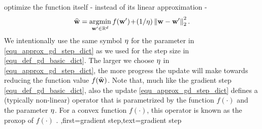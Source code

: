 {{		optimize the function itself - instead of its linear approximation - 
		\begin{align} 
		\label{equ_approx_gd_step_dict}
		\widehat{{\bf w}} = \operatorname*{argmin}_{{\bf w}' \in \mathbb{R}^{d}} f({\bf w}')\!+\!(1/\eta)\left\Vert {{\bf w}-{\bf w}'} \right\Vert_{2}^2. 
		\end{align}
		We intentionally use the same symbol $\eta$ for the parameter in \eqref{equ_approx_gd_step_dict} 
		as we used for the step size in \eqref{equ_def_gd_basic_dict}. The larger we choose $\eta$ in 
		\eqref{equ_approx_gd_step_dict}, the more progress the update will make towards reducing the 
		function value $f(\widehat{{\bf w}})$. Note that, much like the gradient step \eqref{equ_def_gd_basic_dict}, 
		also the update \eqref{equ_approx_gd_step_dict} defines a (typically non-linear) operator 
		that is parametrized by the function $f(\cdot)$ and the parameter $\eta$. For a \gls{convex} function 
		$f(\cdot)$, this operator is known as the \gls{proxop} of $f(\cdot)$ \cite{ProximalMethods}. 
		},first={gradient step},text={gradient step}}
	

